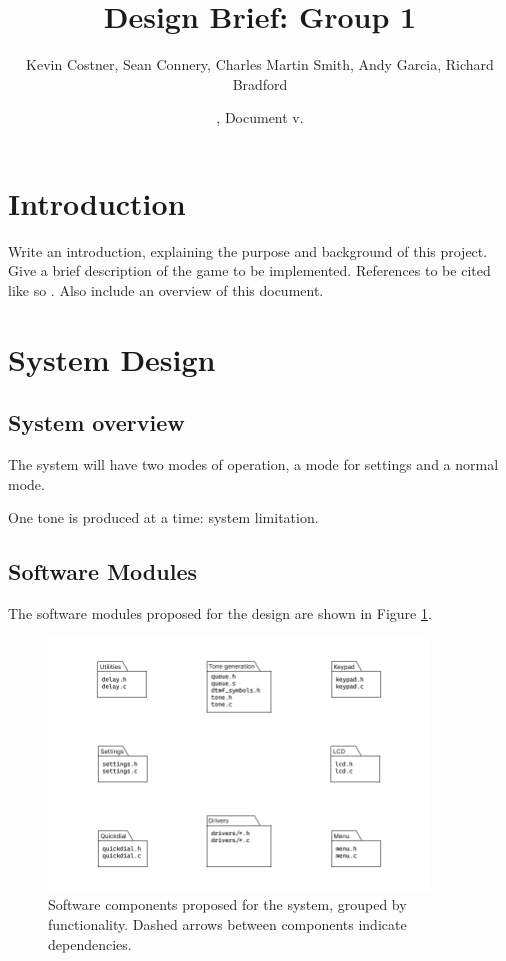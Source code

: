 \documentclass[11pt,a4paper
]{scrartcl}
\title{Design Brief: Group 1}
\author{
   Kevin Costner,
   Sean Connery,
   Charles Martin Smith,
   Andy Garcia,
   Richard Bradford
   }
\date{\svnMaxToday, Document v.\svnInfoMaxRevision}
\begin{document}
\maketitle


\section{Introduction}
Write an introduction, explaining the purpose and background of this project.
Give a brief description of the game to be implemented.
References to be cited like so \cite{stroustrup2000}.
Also include an overview of this document.

\section{System Design}

\subsection{System overview}

The system will have two modes of operation, a mode for settings and a normal mode.

One tone is produced at a time: system limitation.

\subsection{Software Modules}

The software modules proposed for the design are shown in Figure \ref{fig:software_components}. 

\begin{figure}
   \centering
   \includegraphics[width=0.9\textwidth]{software_components}
   \caption{Software components proposed for the system, grouped by functionality. Dashed arrows between components indicate dependencies.}
   \label{fig:software_components}
\end{figure}
\end{document}
